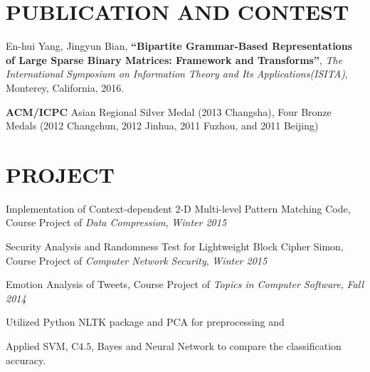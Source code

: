 \documentclass{res}
\newcommand{\parsp}{\vspace{-0.7\baselineskip}}
\newcommand{\additemindent}{\addtolength{\itemindent}{1em}}
\begin{document}
\begin{resume}


\parsp
\section{PUBLICATION AND CONTEST}
	\begin{asparaitem}
		\item En-hui Yang, Jingyun Bian, 
		\textbf{``Bipartite Grammar-Based Representations of Large Sparse Binary Matrices: Framework and Transforms''}, 
		\emph{The International Symposium on Information Theory and Its Applications(ISITA)}, 
		Monterey, California, 
		2016.
		\item \textbf{ACM/ICPC} Asian Regional Silver Medal (2013 Changsha), Four Bronze Medals (2012 Changchun, 2012 Jinhua, 2011 Fuzhou, and 2011 Beijing)
	\end{asparaitem}


\parsp
\section{PROJECT}
\begin{asparaenum}


	\item Implementation of Context-dependent $2$-D Multi-level Pattern Matching Code, Course Project of \emph{Data Compression}, \hfill \emph{Winter 2015}

	\item Security Analysis and Randomness Test for Lightweight Block Cipher Simon, Course Project of \emph{Computer Network Security}, \hfill \emph{Winter 2015}

	\item Emotion Analysis of Tweets, Course Project of \emph{Topics in Computer Software}, \hfill \emph{Fall 2014}
		\begin{asparaitem}
			\additemindent
			\item Utilized Python NLTK package and PCA for preprocessing and 
			\item Applied SVM, C$4.5$, Bayes and Neural Network to compare the classification accuracy.
		\end{asparaitem}


\end{asparaenum}
\end{resume}
\end{document}
